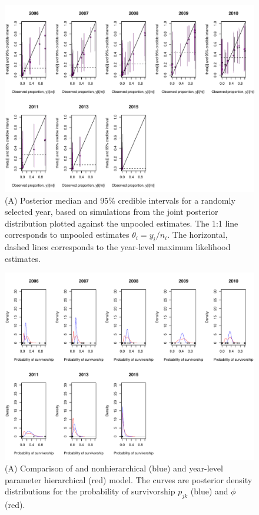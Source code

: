 \documentclass[12pt, oneside, titlepage]{article}   	%
\begin{document}
\begin{figure}[h]
   \centering
       \includegraphics[page=1,width=.9\textwidth]{../../figures/appendix-x-figure54}  
    \caption{ (A) Posterior median and 95\% credible intervals for a randomly selected year, based on simulations from the joint posterior distribution plotted against the unpooled estimates. The 1:1 line corresponds to unpooled estimates $\theta_i = y_i/n_i$. The horizontal, dashed lines corresponds to the year-level maximum likelihood estimates. } 
 \label{fig:hierarchical_shrinking2}
\end{figure}


 \begin{figure}[h]
   \centering
       \includegraphics[page=1,width=.9\textwidth]{../../figures/appendix-x-hierarchyPosteriors_nh_hyear}  
    \caption{ (A) Comparison of and nonhierarchical (blue) and year-level parameter hierarchical (red) model. The curves are posterior density distributions for the probability of survivorship $p_{jk}$ (blue) and $\phi$ (red). } 
 \label{fig:hierarchyPosteriors_nh_hyear}
\end{figure}
\end{document}
